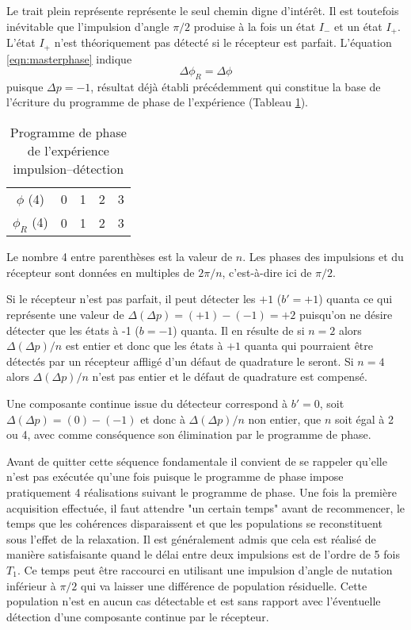 Le trait plein représente représente le seul chemin digne d'intérêt.
Il est toutefois inévitable que l'impulsion d'angle $\pi/2$
produise à la fois un état $I_-$ et un état $I_+$.
L'état $I_+$ n'est théoriquement pas détecté si le récepteur est parfait.
L'équation \ref{eqn:masterphase} indique
\begin{equation}
\Delta\phi_R = \Delta\phi
\end{equation}
puisque $\Delta p = -1$, résultat déjà établi précédemment qui constitue
la base de l'écriture du programme de phase de l'expérience
(Tableau \ref{tab:impuldetec}).

\begin{table}[hbt]
\begin{center}
\begin{tabular}{ccccc}
\hline
$\phi$ (4) & 0 & 1 & 2 & 3 \\
$\phi_R$ (4) & 0 & 1 & 2 & 3 \\
\hline
\end{tabular}
\caption{\label{tab:impuldetec}Programme de phase de l'expérience impulsion--détection}
\end{center}
\end{table}

Le nombre 4 entre parenthèses est la valeur de $n$.
Les phases des impulsions
et du récepteur sont données en multiples de $2\pi/n$, c'est-à-dire ici de $\pi/2$.

Si le récepteur n'est pas parfait, il peut détecter les $+1$ ($b'=+1$)
quanta ce qui représente une valeur de $\Delta(\Delta p) = (+1)-(-1) = +2$ 
puisqu'on ne désire détecter que les états à -1 ($b=-1$) quanta.
Il en résulte de si $n=2$ alors $\Delta(\Delta p)/n$ est entier et donc que les
états à $+1$ quanta qui pourraient être détectés par un récepteur affligé
d'un défaut de quadrature le seront.
Si $n=4$ alors $\Delta(\Delta p)/n$ n'est pas entier et le défaut de quadrature
est compensé.

Une composante continue issue du détecteur correspond à $b'=0$,
soit $\Delta(\Delta p) = (0)-(-1)$ et donc à $\Delta(\Delta p)/n$ non entier,
que $n$ soit égal à 2 ou 4, avec comme conséquence son élimination par
le programme de phase.

Avant de quitter cette séquence fondamentale il convient de se rappeler
qu'elle n'est pas exécutée qu'une fois puisque le programme de phase
impose pratiquement 4 réalisations suivant le programme de phase.
Une fois la première acquisition effectuée, il faut attendre "un certain temps"
avant de recommencer, le temps que les cohérences disparaissent 
et que les populations se reconstituent sous l'effet de la relaxation.
Il est généralement admis que cela est réalisé de manière satisfaisante
quand le délai entre deux impulsions est de l'ordre de 5 fois $T_1$.
Ce temps peut être raccourci en utilisant une impulsion d'angle de nutation
inférieur à $\pi/2$ qui va laisser une différence de population résiduelle.
Cette population n'est en aucun cas détectable et est sans rapport avec
l'éventuelle détection d'une composante continue par le récepteur.

